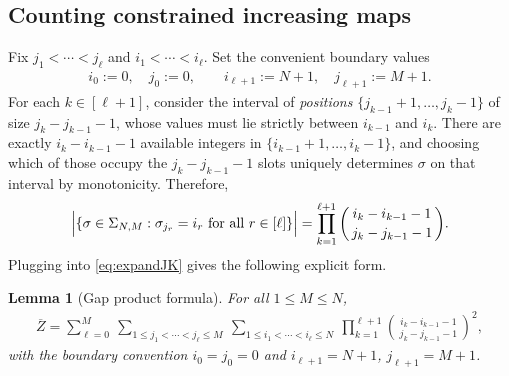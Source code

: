 \documentclass[11pt]{amsart}
\numberwithin{equation}{section}
\numberwithin{equation}{section}
\newcommand{\1}{\mathbbm{1}}
\newtheorem{lemma}[theorem]{Lemma}
\theoremstyle{definition}
\begin{document}
\subsection{Counting constrained increasing maps}
Fix $j_1<\cdots<j_\ell$ and $i_1<\cdots<i_\ell$. Set the convenient boundary values
\begin{align*}
    i_0:=0,\quad j_0:=0,\qquad i_{\ell+1}:=N+1,\quad j_{\ell+1}:=M+1.
\end{align*}
For each $k\in[\ell+1]$, consider the interval of \emph{positions} $\{j_{k-1}+1,\dots,j_k-1\}$ of size $j_k-j_{k-1}-1$, whose values must lie strictly between $i_{k-1}$ and $i_k$. There are exactly $i_k-i_{k-1}-1$ available integers in $\{i_{k-1}+1,\dots,i_k-1\}$, and choosing which of those occupy the $j_k-j_{k-1}-1$ slots uniquely determines $\sigma$ on that interval by monotonicity. Therefore,
\begin{align*}
    \Bigl|\{\sigma\in\Sigma_{N,M}:\sigma_{j_r}=i_r \text{ for all } r \in [\ell] \}\Bigr| =\prod_{k=1}^{\ell+1}\binom{i_k-i_{k-1}-1}{\,j_k-j_{k-1}-1\,}.
\end{align*}
Plugging into \eqref{eq:expandJK} gives the following explicit form.

\begin{lemma}[Gap product formula]\label{lem:gap}
For all $1\le M\le N$,
\begin{align*}
    \overline{Z} =\sum_{\ell=0}^{M}\ \sum_{1\le j_1<\cdots<j_\ell\le M}\ \sum_{1\le i_1<\cdots<i_\ell\le N} \ \prod_{k=1}^{\ell+1}\binom{i_k-i_{k-1}-1}{\,j_k-j_{k-1}-1\,}^{\!2},
\end{align*}
with the boundary convention $i_0=j_0=0$ and $i_{\ell+1}=N+1$, $j_{\ell+1}=M+1$.
\end{lemma}
\end{document}
